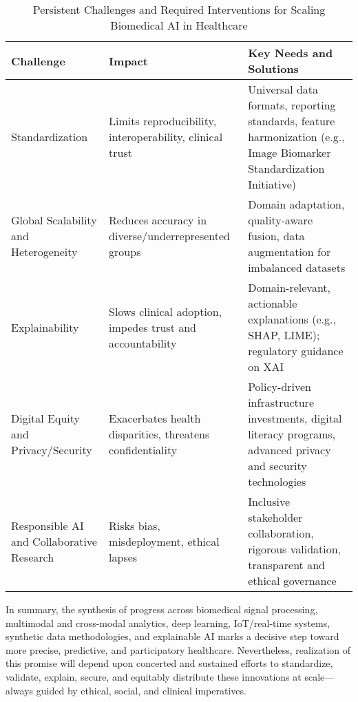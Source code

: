 \documentclass[sigconf]{acmart}
\begin{document}
\begin{table*}[htbp]
\centering
\caption{Persistent Challenges and Required Interventions for Scaling Biomedical AI in Healthcare}
\label{tab:challenges_summary}
\begin{adjustbox}{max width=\textwidth}
\begin{tabular}{lll}
\toprule
\textbf{Challenge} & \textbf{Impact} & \textbf{Key Needs and Solutions} \\
\midrule
Standardization & Limits reproducibility, interoperability, clinical trust & Universal data formats, reporting standards, feature harmonization (e.g., Image Biomarker Standardization Initiative) \\
Global Scalability and Heterogeneity & Reduces accuracy in diverse/underrepresented groups & Domain adaptation, quality-aware fusion, data augmentation for imbalanced datasets \\
Explainability & Slows clinical adoption, impedes trust and accountability & Domain-relevant, actionable explanations (e.g., SHAP, LIME); regulatory guidance on XAI\\
Digital Equity and Privacy/Security & Exacerbates health disparities, threatens confidentiality & Policy-driven infrastructure investments, digital literacy programs, advanced privacy and security technologies \\
Responsible AI and Collaborative Research & Risks bias, misdeployment, ethical lapses & Inclusive stakeholder collaboration, rigorous validation, transparent and ethical governance \\
\bottomrule
\end{tabular}
\end{adjustbox}
\end{table*}

In summary, the synthesis of progress across biomedical signal processing, multimodal and cross-modal analytics, deep learning, IoT/real-time systems, synthetic data methodologies, and explainable AI marks a decisive step toward more precise, predictive, and participatory healthcare. Nevertheless, realization of this promise will depend upon concerted and sustained efforts to standardize, validate, explain, secure, and equitably distribute these innovations at scale—always guided by ethical, social, and clinical imperatives.



\end{document}
